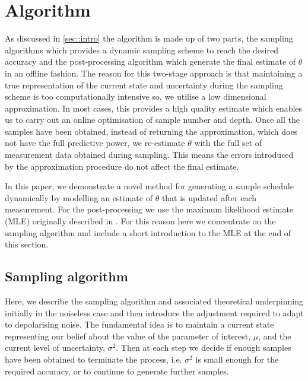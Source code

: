 
\section{Algorithm}
As discussed in \ref{sec::intro} the algorithm is made up of two parts, the sampling algorithms which provides a dynamic sampling scheme to reach the desired accuracy and the post-processing algorithm which generate the final estimate of $\theta$ in an offline fashion. The reason for this two-stage approach is that maintaining a true representation of the current state and uncertainty during the sampling scheme is too computationally intensive so, we utilise a low dimensional approximation. In most cases, this provides a high quality estimate which enables us to carry out an online optimisation of sample number and depth. Once all the samples have been obtained, instead of returning the approximation, which does not have the full predictive power, we re-estimate $\theta$ with the full set of measurement data obtained during sampling. This means the errors introduced by the approximation procedure do not affect the final estimate.

In this paper, we demonstrate a novel method for generating a sample schedule dynamically by modelling an estimate of $\theta$ that is updated after each measurement. For the post-processing we use the maximum likelihood estimate (MLE) originally described in \cite{MLE}. For this reason here we concentrate on the sampling algorithm and include a short introduction to the MLE at the end of this section.
\subsection{Sampling algorithm}
Here, we describe the sampling algorithm and associated theoretical underpinning initially in the noiseless case and then introduce the adjustment required to adapt to depolarising noise. The fundamental idea is to maintain a current state representing our belief about the value of the parameter of interest, $\mu$, and the current level of uncertainty, $\sigma^2$. Then at each step we decide if enough samples have been obtained to terminate the process, i.e. $\sigma^2$ is small enough for the required accuracy, or to continue to generate further samples.

